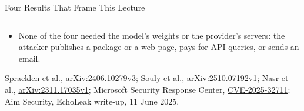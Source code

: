 \begin{frame}{Four Results That Frame This Lecture}
\begin{columns}[T,onlytextwidth]
  \end{columns}
  \vspace{0.3em}
  \begin{itemize}\footnotesize
    \item[\textcolor{red}{$\blacktriangleright$}] None of the four needed the model's weights or the provider's servers: the attacker publishes a package or a web page, pays for API queries, or sends an email.
  \end{itemize}
  \vspace{0.1em}
  {\scriptsize Spracklen et al., \href{https://arxiv.org/abs/2406.10279v3}{arXiv:2406.10279v3}; Souly et al., \href{https://arxiv.org/abs/2510.07192v1}{arXiv:2510.07192v1}; Nasr et al., \href{https://arxiv.org/abs/2311.17035v1}{arXiv:2311.17035v1}; Microsoft Security Response Center, \href{https://msrc.microsoft.com/update-guide/vulnerability/CVE-2025-32711}{CVE-2025-32711}; Aim Security, EchoLeak write-up, 11 June 2025.\par}
\end{frame}

